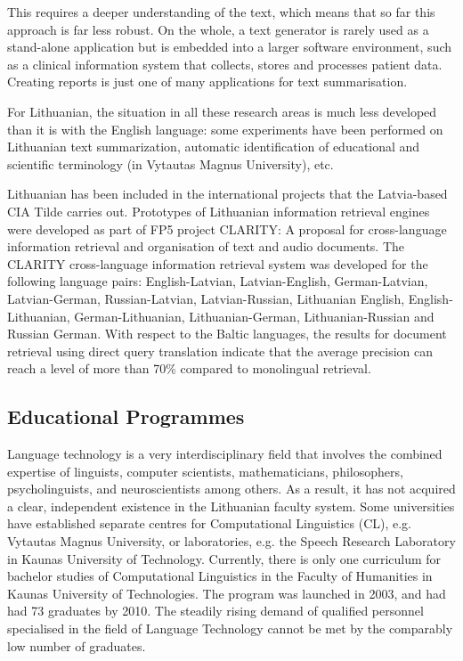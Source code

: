 \documentclass[]{../metanetpaper}
\begin{document}
\begin{multicols}{2}
This requires a deeper understanding of the text, which means that so far this approach is far less robust. On the whole, a text generator is rarely used as a stand-alone application but is embedded into a larger software environment, such as a clinical information system that collects, stores and processes patient data. Creating reports is just one of many applications for text summarisation. 

 For Lithuanian, the situation in all these research areas is much less developed than it is with the English language: some experiments have been performed on Lithuanian text summarization, automatic identification of educational and scientific terminology (in Vytautas Magnus University), etc.

Lithuanian has been included in the international projects that the Latvia-based CIA Tilde carries out. Prototypes of Lithuanian information retrieval engines were developed as part of FP5 project CLARITY: A proposal for cross-language information retrieval and organisation of text and audio documents. The CLARITY cross-language information retrieval system was developed for the following language pairs:  English-Latvian, Latvian-English, German-Latvian, Latvian-German, Russian-Latvian, Latvian-Russian, Lithuanian English, English-Lithuanian, German-Lithuanian, Lithuanian-German, Lithuanian-Russian and Russian German. With respect to the Baltic languages, the results for document retrieval using direct query translation indicate that the average precision can reach a level of more than 70\% compared to monolingual retrieval.

\subsection{Educational Programmes}

 Language technology is a very interdisciplinary field that involves the combined expertise of linguists, computer scientists, mathematicians, philosophers, psycholinguists, and neuroscientists among others. As a result, it has not acquired a clear, independent existence in the Lithuanian faculty system. Some universities have established separate centres for Computational Linguistics (CL), e.g. Vytautas Magnus University, or laboratories, e.g. the Speech Research Laboratory in Kaunas University of Technology. Currently, there is only one curriculum for bachelor studies of Computational Linguistics in the Faculty of Humanities in Kaunas University of Technologies. The program was launched in 2003, and had had 73 graduates by 2010. The steadily rising demand of qualified personnel specialised in the field of Language Technology cannot be met by the comparably low number of graduates.


\end{multicols}
\end{document}
